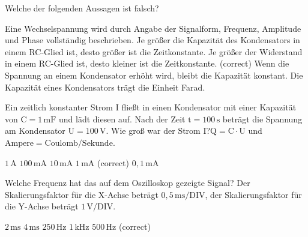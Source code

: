 \documentclass[11pt]{exam}
\begin{document}
\setlength{\voffset}{-0.5in}
\setlength{\headsep}{5pt}

\hspace{2mm}
 \hspace{5mm}
\vspace{4mm}

\begin{questions}

\question Welche der folgenden Aussagen ist falsch?

\begin{choices}
	\choice Eine Wechselspannung wird durch Angabe der Signalform, Frequenz, Amplitude und Phase vollständig beschrieben.
	\choice Je größer die Kapazität des Kondensators in einem RC-Glied ist, desto größer ist die Zeitkonstante.
	\choice Je größer der Widerstand in einem RC-Glied ist, desto kleiner ist die Zeitkonstante. (correct)
	\choice Wenn die Spannung an einem Kondensator erhöht wird, bleibt die Kapazität konstant.
	\choice Die Kapazität eines Kondensators trägt die Einheit Farad.
\end{choices}

\vspace{3mm}\question Ein zeitlich konstanter Strom \(\mathrm{I}\) fließt in einen Kondensator mit einer Kapazität von \(\mathrm{C=1\,mF}\) und lädt diesen auf. Nach der Zeit \(\mathrm{t=100\,s}\) beträgt die Spannung am Kondensator \(\mathrm{U=100\,V}\). Wie groß war der Strom \(\mathrm{I}\)?\(\mathrm{Q=C \cdot U}\) und \(\mathrm{Ampere=Coulomb/Sekunde}\).

\begin{choices}
	\choice \(\mathrm{1\,A}\)
	\choice \(\mathrm{100\,mA}\)
	\choice \(\mathrm{10\,mA}\)
	\choice \(\mathrm{1\,mA}\) (correct)
	\choice \(\mathrm{0,1\,mA}\)
\end{choices}

\vspace{3mm}\question Welche Frequenz hat das auf dem Oszilloskop gezeigte Signal? Der Skalierungsfaktor für die X-Achse beträgt \(\mathrm{0,5\,ms/DIV}\), der Skalierungsfaktor für die Y-Achse beträgt \(\mathrm{1\,V/DIV}\).

\begin{choices}
	\choice \(\mathrm{2\,ms}\)
	\choice \(\mathrm{4\,ms}\)
	\choice \(\mathrm{250\,Hz}\)
	\choice \(\mathrm{1\,kHz}\)
	\choice \(\mathrm{500\,Hz}\) (correct)
\end{choices}


\end{questions}
\end{document}
